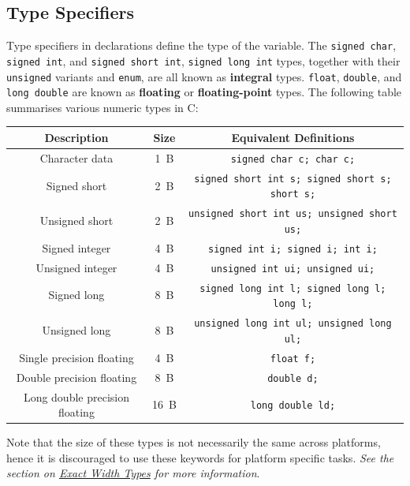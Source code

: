 \documentclass[a4paper]{report}
\begin{document}
\subsection{Type Specifiers}
Type specifiers in declarations define the type of the variable.
The \texttt{signed char}, \texttt{signed int}, and
\texttt{signed short int}, \texttt{signed long int} types, together with their \texttt{unsigned} variants
and \texttt{enum}, are all known as \textbf{integral} types.
\texttt{float}, \texttt{double}, and \texttt{long double} are known as \textbf{floating} or \textbf{floating-point} types.
The following table summarises various numeric types in C\@:
\begin{table}[H]
    \centering
    \begin{tabular}{c c c}
        \toprule
        \textbf{Description}           & \textbf{Size} & \textbf{Equivalent Definitions}                              \\
        \midrule
        Character data                 & \qty{1}{B}    & \texttt{signed char c; char c;}                       \\
        Signed short                   & \qty{2}{B}    & \texttt{signed short int s; signed short s; short s;} \\
        Unsigned short                 & \qty{2}{B}    & \texttt{unsigned short int us; unsigned short us;}    \\
        Signed integer                 & \qty{4}{B}    & \texttt{signed int i; signed i; int i;}               \\
        Unsigned integer               & \qty{4}{B}    & \texttt{unsigned int ui; unsigned ui;}                \\
        Signed long                    & \qty{8}{B}    & \texttt{signed long int l; signed long l; long l;}    \\
        Unsigned long                  & \qty{8}{B}    & \texttt{unsigned long int ul; unsigned long ul;}      \\
        Single precision floating      & \qty{4}{B}    & \texttt{float f;}                                     \\
        Double precision floating      & \qty{8}{B}    & \texttt{double d;}                                    \\
        Long double precision floating & \qty{16}{B}   & \texttt{long double ld;}                              \\
        \bottomrule
    \end{tabular}
\end{table}
Note that the size of these types is not necessarily the same across platforms, hence it is discouraged to use these keywords for
platform specific tasks. \emph{See the section on \hyperref[sec:exact_width_types]{Exact Width Types} for more information}.
\end{document}
